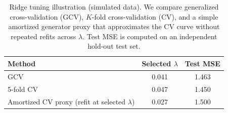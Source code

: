 \begin{table}[H]
\centering
\caption{Ridge tuning illustration (simulated data). We compare generalized cross-validation (GCV), $K$-fold cross-validation (CV), and a simple amortized generator proxy that approximates the CV curve without repeated refits across $\lambda$. Test MSE is computed on an independent hold-out test set.}
\label{tab:ridge-tuning}
\begin{tabular}{lcc}
\hline
Method & Selected $\lambda$ & Test MSE\\
\hline
GCV & 0.041 & 1.463 \\
5-fold CV & 0.047 & 1.450 \\
Amortized CV proxy (refit at selected $\lambda$) & 0.027 & 1.500 \\
\hline
\end{tabular}
\end{table}
